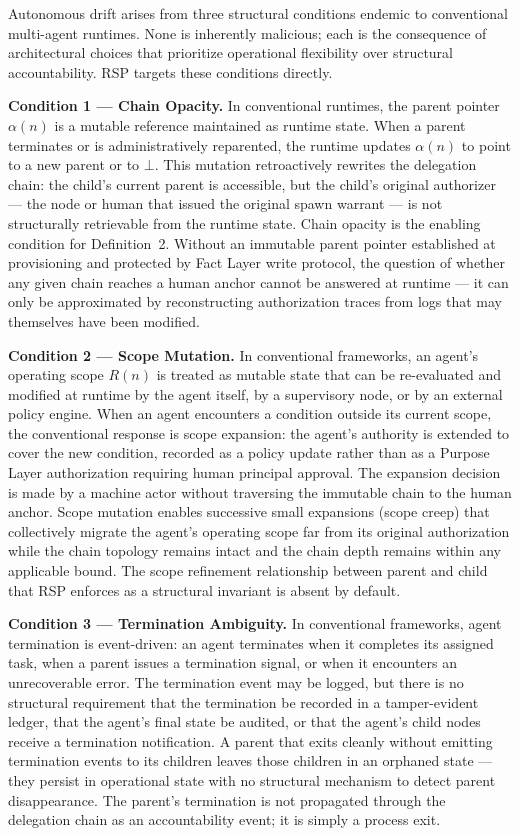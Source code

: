 Autonomous drift arises from three structural conditions endemic to conventional multi-agent runtimes. None is inherently malicious; each is the consequence of architectural choices that prioritize operational flexibility over structural accountability. RSP targets these conditions directly.

\medskip
\noindent\textbf{Condition 1 — Chain Opacity.}
In conventional runtimes, the parent pointer $\alpha(n)$ is a mutable reference maintained as runtime state. When a parent terminates or is administratively reparented, the runtime updates $\alpha(n)$ to point to a new parent or to $\bot$. This mutation retroactively rewrites the delegation chain: the child's current parent is accessible, but the child's original authorizer — the node or human that issued the original spawn warrant — is not structurally retrievable from the runtime state. Chain opacity is the enabling condition for Definition~2. Without an immutable parent pointer established at provisioning and protected by Fact Layer write protocol, the question of whether any given chain reaches a human anchor cannot be answered at runtime — it can only be approximated by reconstructing authorization traces from logs that may themselves have been modified.

\medskip
\noindent\textbf{Condition 2 — Scope Mutation.}
In conventional frameworks, an agent's operating scope $R(n)$ is treated as mutable state that can be re-evaluated and modified at runtime by the agent itself, by a supervisory node, or by an external policy engine. When an agent encounters a condition outside its current scope, the conventional response is scope expansion: the agent's authority is extended to cover the new condition, recorded as a policy update rather than as a Purpose Layer authorization requiring human principal approval. The expansion decision is made by a machine actor without traversing the immutable chain to the human anchor. Scope mutation enables successive small expansions (scope creep) that collectively migrate the agent's operating scope far from its original authorization while the chain topology remains intact and the chain depth remains within any applicable bound. The scope refinement relationship between parent and child that RSP enforces as a structural invariant is absent by default.

\medskip
\noindent\textbf{Condition 3 — Termination Ambiguity.}
In conventional frameworks, agent termination is event-driven: an agent terminates when it completes its assigned task, when a parent issues a termination signal, or when it encounters an unrecoverable error. The termination event may be logged, but there is no structural requirement that the termination be recorded in a tamper-evident ledger, that the agent's final state be audited, or that the agent's child nodes receive a termination notification. A parent that exits cleanly without emitting termination events to its children leaves those children in an orphaned state — they persist in operational state with no structural mechanism to detect parent disappearance. The parent's termination is not propagated through the delegation chain as an accountability event; it is simply a process exit.

